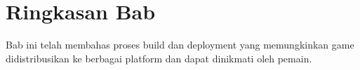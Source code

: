\section{Ringkasan Bab}

Bab ini telah membahas proses build dan deployment yang memungkinkan game didistribusikan ke berbagai platform dan dapat dinikmati oleh pemain.
